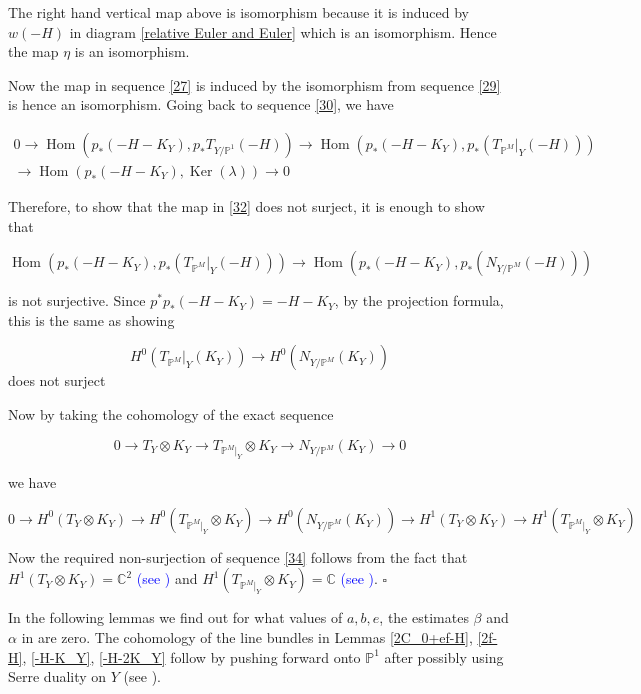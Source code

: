 \documentclass[11pt,twoside]{amsart}
\theoremstyle{plain}
\numberwithin{equation}{section}
\theoremstyle{definition}
\newcommand*{\QEDB}{\hfill\ensuremath{\square}}
\begin{document}
The right hand vertical map above is isomorphism because it is induced by $w(-H)$ in diagram \ref{relative Euler and Euler} which is an isomorphism. Hence the map $\eta$ is an isomorphism.

\color{black}
Now the map in sequence \ref{27} is induced by the isomorphism from sequence \ref{29} is hence an isomorphism. Going back to sequence \ref{30}, we have 

\begin{multline}\label{31}
0 \to \operatorname{Hom}(p_*(-H-K_Y), 
 p_*T_{Y/\mathbb{P}^1}(-H))  \to \operatorname{Hom}(p_*(-H-K_Y), p_*(T_{\mathbb{P}^M}|_Y(-H))) \\ \to \operatorname{Hom}(p_*(-H-K_Y),\operatorname{Ker}(\lambda)) \to 0
\end{multline}

Therefore, to show that the map in \ref{32} does not surject, it is enough to show that

\begin{equation}\label{33}
  \operatorname{Hom}(p_*(-H-K_Y), p_*(T_{\mathbb{P}^M}|_Y(-H))) \to \operatorname{Hom}(p_*(-H-K_Y), p_*(N_{Y/\mathbb{P}^M}(-H)))  
\end{equation}

is not surjective. Since $p^*p_*(-H-K_Y) = -H-K_Y$, by the projection formula, this is the same as showing 

\begin{equation}\label{34}
   H^0(T_{\mathbb{P}^M}|_Y(K_Y)) \to H^0(N_{Y/\mathbb{P}^M}(K_Y)) 
\end{equation}
does not surject

Now by taking the cohomology of the exact sequence 

$$0 \to T_Y \otimes K_Y \to T_{\mathbb{P}^M|_Y} \otimes K_Y \to N_{Y/\mathbb{P}^M}(K_Y) \to 0$$


we have 

$$0 \to H^0(T_Y \otimes K_Y) \to H^0(T_{\mathbb{P}^M|_Y} \otimes K_Y) \to H^0(N_{Y/\mathbb{P}^M}(K_Y)) \to H^1(T_Y \otimes K_Y) \to H^1(T_{\mathbb{P}^M|_Y} \otimes K_Y)$$

Now the required non-surjection of sequence \ref{34} follows from the fact that $H^1(T_Y \otimes K_Y) = \mathbb{C}^2$ \textcolor{blue}{(see \cite[Lemma $2.6$, (iii)]{BMR21})} and $H^1(T_{\mathbb{P}^M|_Y} \otimes K_Y) = \mathbb{C}$ \textcolor{blue}{(see \cite[Lemma $2.5$, (iii)]{BMR21})}. \QEDB

In the following lemmas we find out for what values of $a, b, e$, the estimates $\beta$ and $\alpha$ in  are zero. The cohomology of the line bundles in Lemmas \ref{2C_0+ef-H}, \ref{2f-H}, \ref{-H-K_Y}, \ref{-H-2K_Y} follow by pushing forward onto $\mathbb{P}^1$ after possibly using Serre duality on $Y$ (see \cite[III, Ex $8.4$]{Hartshorne}).
\end{document}
